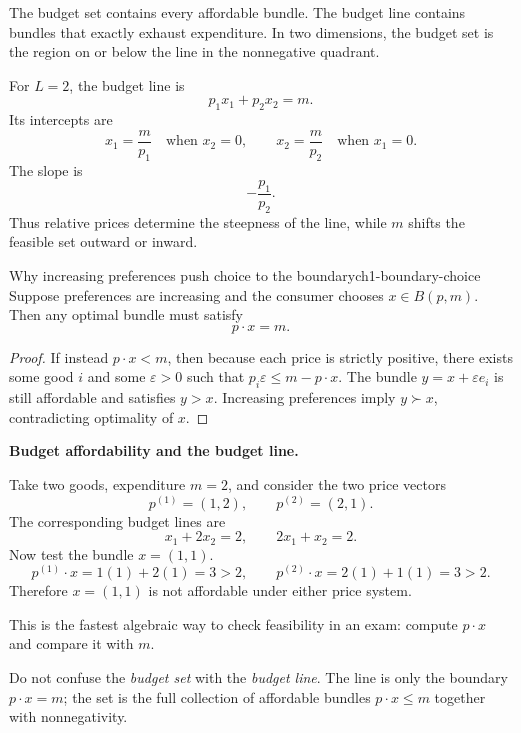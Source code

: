 The budget set contains every affordable bundle. The budget line contains bundles that exactly exhaust expenditure. In two dimensions, the budget set is the region on or below the line in the nonnegative quadrant.

\begin{keyformula}[title={Key Formula: Two-Good Budget Geometry}]
For $L=2$, the budget line is
\[
p_1x_1 + p_2x_2 = m.
\]
Its intercepts are
\[
x_1 = \frac{m}{p_1} \quad \text{when } x_2=0,
\qquad
x_2 = \frac{m}{p_2} \quad \text{when } x_1=0.
\]
The slope is
\[
-\frac{p_1}{p_2}.
\]
Thus relative prices determine the steepness of the line, while $m$ shifts the feasible set outward or inward.
\end{keyformula}

\begin{theorem}{Why increasing preferences push choice to the boundary}{ch1-boundary-choice}
Suppose preferences are increasing and the consumer chooses $x \in B(p,m)$. Then any optimal bundle must satisfy
\[
p \cdot x = m.
\]
\end{theorem}

\begin{proof}
If instead $p \cdot x < m$, then because each price is strictly positive, there exists some good $i$ and some $\varepsilon > 0$ such that $p_i\varepsilon \le m - p \cdot x$. The bundle $y = x + \varepsilon e_i$ is still affordable and satisfies $y > x$. Increasing preferences imply $y \succ x$, contradicting optimality of $x$.
\end{proof}

\begin{examplebox}
\textbf{Budget affordability and the budget line.}

Take two goods, expenditure $m=2$, and consider the two price vectors
\[
p^{(1)}=(1,2), \qquad p^{(2)}=(2,1).
\]
The corresponding budget lines are
\[
x_1 + 2x_2 = 2, \qquad 2x_1 + x_2 = 2.
\]
Now test the bundle $x=(1,1)$.
\[
p^{(1)} \cdot x = 1(1)+2(1)=3 > 2,
\qquad
p^{(2)} \cdot x = 2(1)+1(1)=3 > 2.
\]
Therefore $x=(1,1)$ is not affordable under either price system.

This is the fastest algebraic way to check feasibility in an exam: compute $p \cdot x$ and compare it with $m$.
\end{examplebox}

\begin{commonmistake}
Do not confuse the \emph{budget set} with the \emph{budget line}. The line is only the boundary $p\cdot x = m$; the set is the full collection of affordable bundles $p\cdot x \le m$ together with nonnegativity.
\end{commonmistake}

